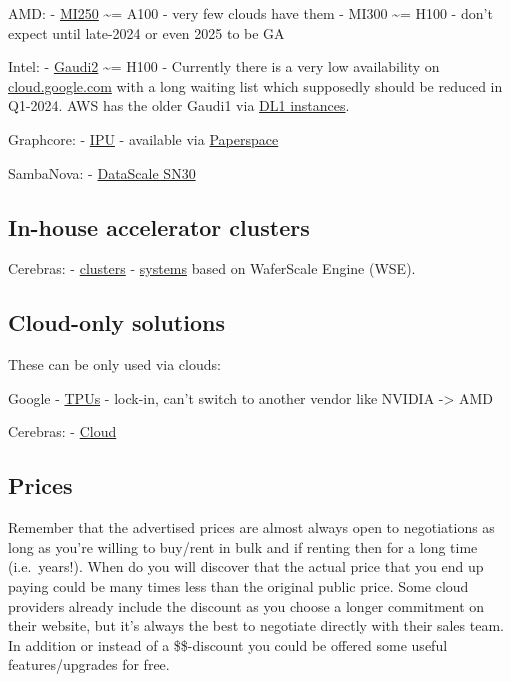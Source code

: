 \documentclass[
]{report}
\begin{document}
AMD: -
\href{https://www.amd.com/en/products/accelerators/instinct/mi200/mi250.html}{MI250}
\textasciitilde= A100 - very few clouds have them - MI300
\textasciitilde= H100 - don't expect until late-2024 or even 2025 to be
GA

Intel: - \href{https://habana.ai/products/gaudi2/}{Gaudi2}
\textasciitilde= H100 - Currently there is a very low availability on
\href{https://cloud.google.com}{cloud.google.com} with a long waiting
list which supposedly should be reduced in Q1-2024. AWS has the older
Gaudi1 via \href{https://aws.amazon.com/ec2/instance-types/dl1/}{DL1
instances}.

Graphcore: - \href{https://www.graphcore.ai/products/ipu}{IPU} -
available via \href{https://www.paperspace.com/graphcore}{Paperspace}

SambaNova: - \href{https://sambanova.ai/products/datascale/}{DataScale
SN30}

\subsection{In-house accelerator
clusters}\label{in-house-accelerator-clusters}

Cerebras: - \href{https://www.cerebras.net/product-cluster/}{clusters} -
\href{https://www.cerebras.net/product-system/}{systems} based on
WaferScale Engine (WSE).

\subsection{Cloud-only solutions}\label{cloud-only-solutions}

These can be only used via clouds:

Google - \href{https://cloud.google.com/tpu}{TPUs} - lock-in, can't
switch to another vendor like NVIDIA -\textgreater{} AMD

Cerebras: - \href{https://www.cerebras.net/product-cloud/}{Cloud}

\subsection{Prices}\label{prices}

Remember that the advertised prices are almost always open to
negotiations as long as you're willing to buy/rent in bulk and if
renting then for a long time (i.e.~years!). When do you will discover
that the actual price that you end up paying could be many times less
than the original public price. Some cloud providers already include the
discount as you choose a longer commitment on their website, but it's
always the best to negotiate directly with their sales team. In addition
or instead of a \$\$-discount you could be offered some useful
features/upgrades for free.
\end{document}
